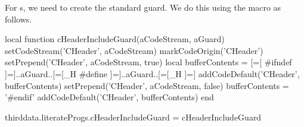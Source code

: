\startMkIVCode
{}

  





\setLitProgsOriginMarker[MkIVCode][markMkIVCodeOrigin]
\setLitProgsOriginMarker[MpIVCode][markMpIVCodeOrigin]
\setLitProgsOriginMarker[LuaCode][markLuaCodeOrigin]
\setLitProgsOriginMarker[LuaTemplate][markLuaTemplateOrigin]
\setLitProgsOriginMarker[CHeader][markCHeaderOrigin]
\setLitProgsOriginMarker[CCode][markCCodeOrigin]
\stopMkIVCode

For s, we need to create the standard  guard. 
We do this using the \type{\CHeaderIncludeGuard} macro as follows. 

\startMkIVCode
\def\CHeaderIncludeGuard#1#2{
  \directlua{
    thirddata.literateProgs.cHeaderIncludeGuard('#1', '#2')
  }
}
\stopMkIVCode

\startLuaCode
local function cHeaderIncludeGuard(aCodeStream, aGuard)
  setCodeStream('CHeader', aCodeStream)
  markCodeOrigin('CHeader')
  setPrepend('CHeader', aCodeStream, true)
  local bufferContents = [=[
#ifndef ]=]..aGuard..[=[_H
#define ]=]..aGuard..[=[_H
]=]
  addCodeDefault('CHeader', bufferContents)
  setPrepend('CHeader', aCodeStream, false)
  bufferContents = '#endif'
  addCodeDefault('CHeader', bufferContents)
end

thirddata.literateProgs.cHeaderIncludeGuard = cHeaderIncludeGuard
\stopLuaCode


